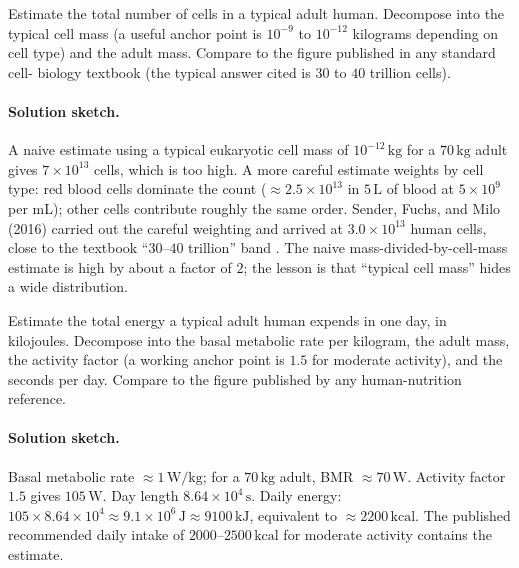 \begin{exercise}
Estimate the total number of cells in a typical adult human.
Decompose into the typical cell mass (a useful anchor point is
$10^{-9}$ to $10^{-12}$ kilograms depending on cell type) and the
adult mass. Compare to the figure published in any standard cell-
biology textbook (the typical answer cited is $30$ to $40$
trillion cells).
\end{exercise}

\paragraph{Solution sketch.}
A naive estimate using a typical eukaryotic cell mass of
$10^{-12} \,\si{\kilo\gram}$ for a $70 \,\si{\kilo\gram}$ adult
gives $7 \times 10^{13}$ cells, which is too high. A more careful
estimate weights by cell type: red blood cells dominate the count
($\approx 2.5 \times 10^{13}$ in $5 \,\si{\liter}$ of blood at
$5 \times 10^{9}$ per mL); other cells contribute roughly the same
order. Sender, Fuchs, and Milo (2016) carried out the careful
weighting and arrived at $3.0 \times 10^{13}$ human cells, close
to the textbook ``$30$--$40$ trillion'' band
\cite{paper:ch09-sender-cells-2016}. The naive mass-divided-by-cell-mass
estimate is high by about a factor of $2$; the lesson is that
``typical cell mass'' hides a wide distribution.

\begin{exercise}
Estimate the total energy a typical adult human expends in one day,
in kilojoules. Decompose into the basal metabolic rate per
kilogram, the adult mass, the activity factor (a working anchor
point is $1.5$ for moderate activity), and the seconds per day.
Compare to the figure published by any human-nutrition reference.
\end{exercise}

\paragraph{Solution sketch.}
Basal metabolic rate $\approx 1 \,\si{\watt\per\kilo\gram}$; for a
$70 \,\si{\kilo\gram}$ adult, BMR $\approx 70 \,\si{\watt}$.
Activity factor $1.5$ gives $105 \,\si{\watt}$. Day length $8.64
\times 10^{4} \,\si{\second}$. Daily energy: $105 \times 8.64
\times 10^{4} \approx 9.1 \times 10^{6} \,\si{\joule} \approx
9100 \,\si{\kilo\joule}$, equivalent to $\approx 2200 \,\text{kcal}$.
The published recommended daily intake of $2000$--$2500 \,\text{kcal}$
for moderate activity contains the estimate.

